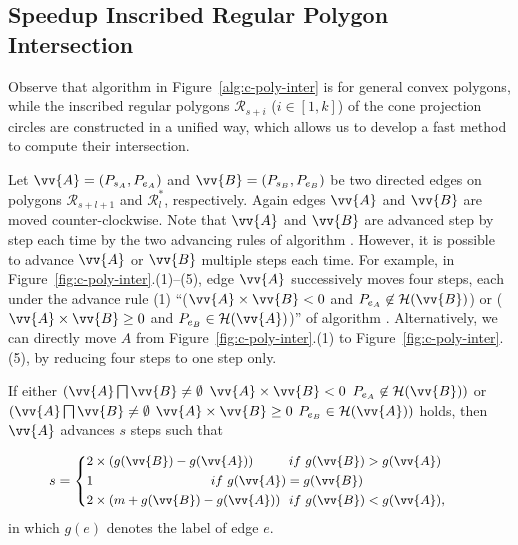 \subsection{Speedup Inscribed Regular Polygon Intersection}
\label{subsec-fastRPI}


Observe that algorithm \cpia in Figure~\ref{alg:c-poly-inter} is for general convex polygons,
while the inscribed regular polygons $\mathcal{R}_{s+i}$ ($i\in[1, k]$) of the cone projection circles are constructed in a unified way,
which allows us to develop a fast method to compute their intersection.

Let $\vv{A} = (P_{s_A}, P_{e_A})$ and $\vv{B} = (P_{s_B}, P_{e_B})$  be two directed edges on polygons $\mathcal{R}_{s+l+1}$ and $\mathcal{R}^*_{l}$, respectively.
Again edges $\vv{A}$ and $\vv{B}$ are moved counter-clockwise. Note that $\vv{A}$ and $\vv{B}$ are advanced step by step each time by the two advancing rules of algorithm \cpia.
%
However, it is possible to advance $\vv{A}$ or $\vv{B}$ multiple steps each time.
%
For example, in Figure~\ref{fig:c-poly-inter}.(1)--(5), edge $\vv{A}$ successively moves four steps, each under the advance rule (1) ``($\vv{A} \times \vv{B} < 0$ and $P_{e_A} \not \in \mathcal{H}(\vv{B})$) or ($\vv{A} \times \vv{B} \ge 0$ and $P_{e_B} \in \mathcal{H}(\vv{A})$)'' of algorithm \cpia.
Alternatively, we can directly move $A$ from Figure~\ref{fig:c-poly-inter}.(1) to Figure~\ref{fig:c-poly-inter}.(5), by reducing four steps to one step only.



\begin{prop}
\label{prop-rule1}
If either $(\vv{A} \bigsqcap \vv{B} \ne \emptyset$ \And $\vv{A} \times \vv{B} < 0$ \And $P_{e_A} \not \in \mathcal{H}(\vv{B}))$ or $(\vv{A} \bigsqcap \vv{B} \ne \emptyset$ \And $\vv{A} \times \vv{B} \ge 0$ \And $P_{e_B} \in \mathcal{H}(\vv{A}))$ holds, then $\vv{A}$ advances $s$ steps such that

\vspace{-1ex}
\begin{equation*}
\label{equ-rule1}
\small
    \hspace{2ex} s =  \left\{
    \begin{aligned}
        & 2\times(g(\vv{B}) - g(\vv{A}))  \hspace{5ex}~~if  ~g(\vv{B}) > g(\vv{A}) \\
        & {1}              \hspace{21ex}~if  ~g(\vv{A}) = g(\vv{B}) \\
        & 2\times(m+g(\vv{B}) - g(\vv{A})) ~~if  ~g(\vv{B}) < g(\vv{A}), \\
    \end{aligned}
    \right.       \hspace{6ex}{}
\end{equation*}
in which $g(e)$ denotes the label of edge $e$.
\end{prop}



